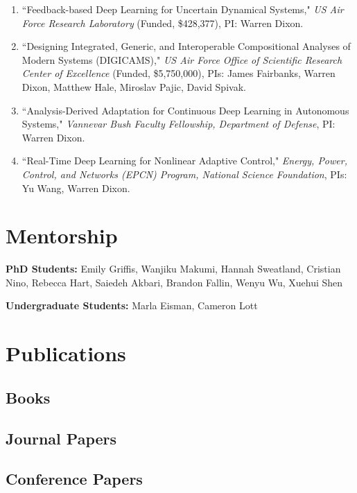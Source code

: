 \documentclass[10pt, letterpaper]{article}
\begin{document}
\begin{enumerate}
    \setlength{\itemsep}{0pt}
    \item ``Feedback-based Deep Learning for Uncertain Dynamical Systems," \textit{US Air Force Research Laboratory} (Funded, \$428,377), PI: Warren Dixon.
    \item ``Designing Integrated, Generic, and Interoperable Compositional Analyses of Modern Systems (DIGICAMS)," \textit{US Air Force Office of Scientific Research Center of Excellence} (Funded, \$5,750,000), PIs: James Fairbanks, Warren Dixon, Matthew Hale, Miroslav Pajic, David Spivak.
    \item ``Analysis-Derived Adaptation for Continuous Deep Learning in Autonomous Systems," \textit{Vannevar Bush Faculty Fellowship, Department of Defense}, PI: Warren Dixon.
    \item ``Real-Time Deep Learning for Nonlinear Adaptive Control," \textit{Energy, Power, Control, and Networks (EPCN) Program, National Science Foundation}, PIs: Yu Wang, Warren Dixon.
\end{enumerate}

\section{Mentorship}

\textbf{PhD Students:} Emily Griffis, Wanjiku Makumi, Hannah Sweatland, Cristian Nino, Rebecca Hart, Saiedeh Akbari, Brandon Fallin, Wenyu Wu, Xuehui Shen

\textbf{Undergraduate Students:} Marla Eisman, Cameron Lott

\section{Publications}

\nocite{*}

\subsection*{Books}
\printbibliography[type=book, heading=none]

\subsection*{Journal Papers}
\printbibliography[type=article, heading=none, nottype=inproceedings, nottype=book, notkeyword=underreview]

\subsection*{Conference Papers}
\printbibliography[type=inproceedings, heading=none]
\end{document}
